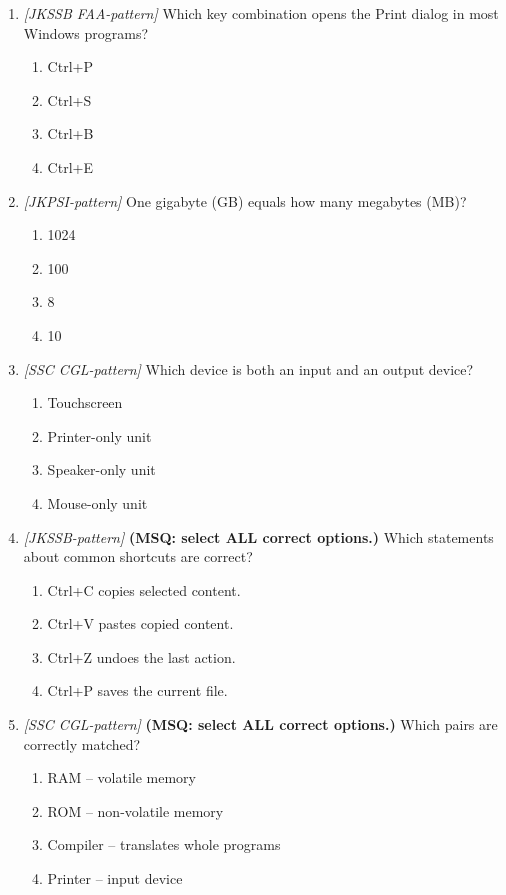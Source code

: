 \documentclass[11pt]{article}
\begin{document}
\begin{enumerate}[label=\textbf{Q\arabic*.}, leftmargin=*]
\item \textit{[JKSSB FAA-pattern]} Which key combination opens the Print dialog in most Windows programs?
  \begin{enumerate}[label=\Alph*.]
    \item Ctrl+P
    \item Ctrl+S
    \item Ctrl+B
    \item Ctrl+E
  \end{enumerate}
\item \textit{[JKPSI-pattern]} One gigabyte (GB) equals how many megabytes (MB)?
  \begin{enumerate}[label=\Alph*.]
    \item 1024
    \item 100
    \item 8
    \item 10
  \end{enumerate}
\item \textit{[SSC CGL-pattern]} Which device is both an input and an output device?
  \begin{enumerate}[label=\Alph*.]
    \item Touchscreen
    \item Printer-only unit
    \item Speaker-only unit
    \item Mouse-only unit
  \end{enumerate}
\item \textit{[JKSSB-pattern]} \textbf{(MSQ: select ALL correct options.)} Which statements about common shortcuts are correct?
  \begin{enumerate}[label=\Alph*.]
    \item Ctrl+C copies selected content.
    \item Ctrl+V pastes copied content.
    \item Ctrl+Z undoes the last action.
    \item Ctrl+P saves the current file.
  \end{enumerate}
\item \textit{[SSC CGL-pattern]} \textbf{(MSQ: select ALL correct options.)} Which pairs are correctly matched?
  \begin{enumerate}[label=\Alph*.]
    \item RAM -- volatile memory
    \item ROM -- non-volatile memory
    \item Compiler -- translates whole programs
    \item Printer -- input device
  \end{enumerate}
\end{enumerate}
\def\JKSSBLessonID{48}\def\JKSSBAnswers{0}
\end{document}
